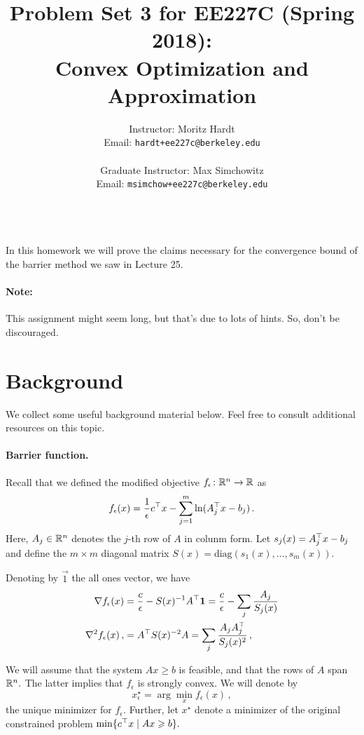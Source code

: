 \documentclass[12pt]{article}
\title{Problem Set 3 for EE227C (Spring 2018):\\
 Convex Optimization and Approximation }
\author{Instructor: Moritz Hardt\\
{\small Email: \tt hardt+ee227c@berkeley.edu}\\ ~\\
Graduate Instructor: Max Simchowitz\\
{\small Email: \tt msimchow+ee227c@berkeley.edu}\\ ~\\
}
\begin{document}



\maketitle

In this homework we will prove the claims necessary for the convergence bound of
the barrier method we saw in Lecture 25.

\paragraph{Note:} This assignment might seem long, but that's due to lots of
hints. So, don't be discouraged.

\section*{Background}

We collect some useful background material below. Feel free to consult
additional resources on this topic.

\paragraph{Barrier function.}
Recall that we defined the modified objective $f_\epsilon\colon\mathbb{R}^n\to\mathbb{R}$ as
\[
f_\epsilon(x) = \frac{1}{\epsilon} c^\top x - \sum_{j=1}^m \ln(A_j^\top x - b_j)\,.
\]
Here, $A_j\in\mathbb{R}^n$ denotes the $j$-th row of $A$ in colunm form.
Let $s_j(x)= A_j^\top x-b_j$ and define the $m\times m$ diagonal matrix
$S(x)=\mathrm{diag}(s_1(x),\dots,s_m(x)).$

Denoting by $\vec{1}$ the all ones vector, we have
\begin{align*}
\nabla f_\epsilon(x) 
&= \frac{c}{\epsilon} - S(x)^{-1}A^\top{\bm{1}}
= \frac{c}{\epsilon} - \sum_j \frac{A_j}{S_j(x)}\\
\nabla^2 f_\epsilon(x) \,,
& =  A^\top S(x)^{-2} A
=  \sum_j \frac{A_jA_j^\top}{S_j(x)^2}\,,
\end{align*}

We will assume that the system $Ax\ge b$ is feasible, and that the rows of $A$
span~$\mathbb{R}^n.$ The latter implies that $f_\epsilon$ is strongly convex. We will denote
by
\[
x_\epsilon^\star=\arg\min_x f_\epsilon(x)\,,
\]
the unique minimizer for $f_\epsilon.$ Further, let $x^\star$ denote a minimizer
of the original constrained problem $\min\{c^\top x\mid Ax\geqslant b\}.$
\end{document}
